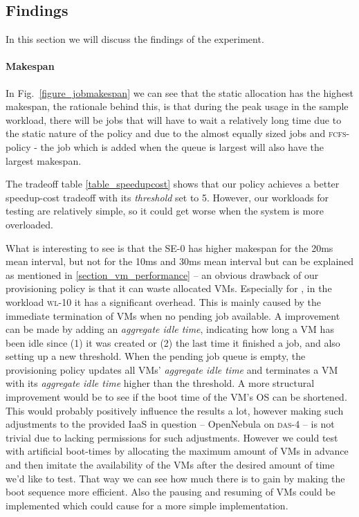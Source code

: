 

\subsection{Findings}
In this section we will discuss the findings of the experiment.

\paragraph{Makespan}
In Fig.~\ref{figure_jobmakespan} we can see that the static allocation
has the highest makespan, the rationale behind this, is that during
the peak usage in the sample workload, there will be jobs that will
have to wait a relatively long time due to the static nature of the
policy and due to the almost equally sized jobs and
\textsc{fcfs}-policy - the job which is added when the queue is largest
will also have the largest makespan.

The tradeoff table \ref{table_speedupcost} shows that our
\policysimpleelastic{} policy achieves a better speedup-cost tradeoff
with its \emph{threshold} set to 5. However, our workloads for testing
are relatively simple, so it could get worse when the system is more
overloaded.



What is interesting to see is that the SE-0 has higher makespan for
the 20ms mean interval, but not for the 10ms and 30ms mean interval
but can be explained as mentioned in \ref{section_vm_performance} --
an obvious drawback of our \policysimpleelastic{} provisioning policy
is that it can waste allocated VMs.  Especially for \SEzero{}, in the
workload \textsc{wl-10} it has a significant overhead. This is mainly
caused by the immediate termination of VMs when no pending job
available. A improvement can be made by adding an \emph{aggregate idle
  time}, indicating how long a VM has been idle since (1) it was
created or (2) the last time it finished a job, and also setting up a
new threshold. When the pending job queue is empty, the provisioning
policy updates all VMs' \emph{aggregate idle time} and terminates a VM
with its \emph{aggregate idle time} higher than the threshold.  A more
structural improvement would be to see if the boot time of the VM's OS
can be shortened. This would probably positively influence the results
a lot, however making such adjustments to the provided IaaS in
question -- OpenNebula on \textsc{das-4} -- is not trivial due to
lacking permissions for such adjustments. However we could test with
artificial boot-times by allocating the maximum amount of VMs in
advance and then imitate the availability of the VMs after the desired
amount of time we'd like to test. That way we can see how much there
is to gain by making the boot sequence more efficient. Also the
pausing and resuming of VMs could be implemented which could cause for
a more simple implementation.

